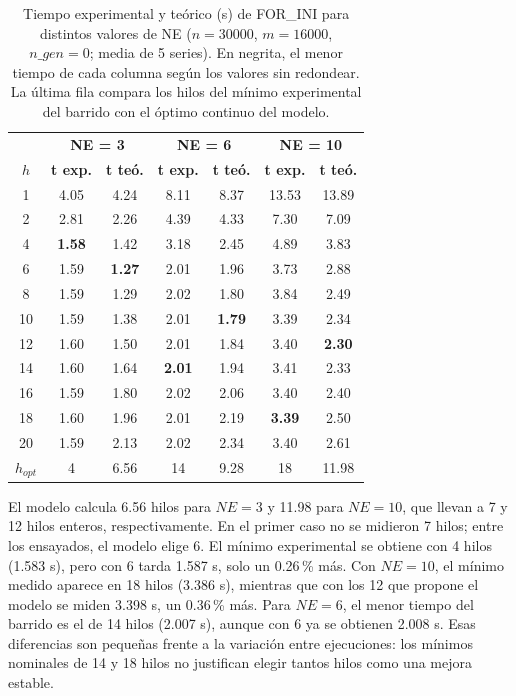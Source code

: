 \documentclass[12pt]{article}
\begin{document}
\begin{enumerate}
\begin{table}[htbp]
\centering
\small
\begin{tabular}{c|cc|cc|cc}
\toprule
 & \multicolumn{2}{c|}{\textbf{NE = 3}} & \multicolumn{2}{c|}{\textbf{NE = 6}} & \multicolumn{2}{c}{\textbf{NE = 10}} \\
\textbf{$h$} & \textbf{t exp.} & \textbf{t teó.} & \textbf{t exp.} & \textbf{t teó.} & \textbf{t exp.} & \textbf{t teó.} \\
\midrule
1 & 4.05 & 4.24 & 8.11 & 8.37 & 13.53 & 13.89 \\
2 & 2.81 & 2.26 & 4.39 & 4.33 & 7.30 & 7.09 \\
4 & \textbf{1.58} & 1.42 & 3.18 & 2.45 & 4.89 & 3.83 \\
6 & 1.59 & \textbf{1.27} & 2.01 & 1.96 & 3.73 & 2.88 \\
8 & 1.59 & 1.29 & 2.02 & 1.80 & 3.84 & 2.49 \\
10 & 1.59 & 1.38 & 2.01 & \textbf{1.79} & 3.39 & 2.34 \\
12 & 1.60 & 1.50 & 2.01 & 1.84 & 3.40 & \textbf{2.30} \\
14 & 1.60 & 1.64 & \textbf{2.01} & 1.94 & 3.41 & 2.33 \\
16 & 1.59 & 1.80 & 2.02 & 2.06 & 3.40 & 2.40 \\
18 & 1.60 & 1.96 & 2.01 & 2.19 & \textbf{3.39} & 2.50 \\
20 & 1.59 & 2.13 & 2.02 & 2.34 & 3.40 & 2.61 \\
\midrule
\textbf{$h_{opt}$} & 4 & 6.56 & 14 & 9.28 & 18 & 11.98 \\
\bottomrule
\end{tabular}
\caption{Tiempo experimental y teórico (s) de FOR\_INI para distintos valores de NE ($n = 30000$, $m = 16000$, $n\_gen = 0$; media de 5 series). En negrita, el menor tiempo de cada columna según los valores sin redondear. La última fila compara los hilos del mínimo experimental del barrido con el óptimo continuo del modelo.}
\label{tab:c3_ne}
\end{table}

El modelo calcula 6.56 hilos para $NE = 3$ y 11.98 para $NE = 10$, que llevan a 7 y 12 hilos enteros, respectivamente. En el primer caso no se midieron 7 hilos; entre los ensayados, el modelo elige 6. El mínimo experimental se obtiene con 4 hilos (1.583 s), pero con 6 tarda 1.587 s, solo un 0.26\,\% más. Con $NE = 10$, el mínimo medido aparece en 18 hilos (3.386 s), mientras que con los 12 que propone el modelo se miden 3.398 s, un 0.36\,\% más. Para $NE = 6$, el menor tiempo del barrido es el de 14 hilos (2.007 s), aunque con 6 ya se obtienen 2.008 s. Esas diferencias son pequeñas frente a la variación entre ejecuciones: los mínimos nominales de 14 y 18 hilos no justifican elegir tantos hilos como una mejora estable.


\end{enumerate}
\end{document}
